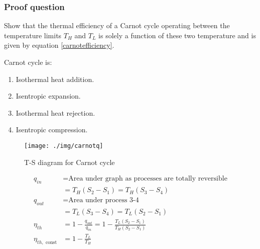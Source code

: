 \subsubsection{Proof question}
Show that the thermal efficiency of a Carnot cycle operating between the temperature limits $T_H$ and $T_L$ is solely a function of these two temperature and is given by equation \ref{carnotefficiency}.

Carnot cycle is:
\begin{enumerate}[noitemsep]
  \item Isothermal heat addition.
  \item Isentropic expansion.
  \item Isothermal heat rejection.
  \item Isentropic compression.
\end{enumerate}
\begin{figure}
  \centering
  \texttt{[image: ./img/carnotq]}
  \caption{T-S diagram for Carnot cycle}
\end{figure}
\begin{align}
  q_{in}                     & = \textrm{Area under graph as processes are totally reversible}          \\
                             & = T_H(S_2 - S_1) = T_H(S_3 - S_4)                                        \\
  q_{out}                    & = \textrm{Area under process 3-4}                                        \\
                             & = T_L(S_3 - S_4) = T_L(S_2 - S_1)                                        \\
  \eta_{th}                  & = 1 - \frac{q_{out}}{q_{in}} = 1 - \frac{T_L(S_2 - S_1)}{T_H(S_2 - S_1)} \\
  \eta_{th, \textrm{ const}} & = 1 - \frac{T_L}{T_H}
\end{align}
